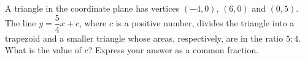 A triangle in the coordinate plane has vertices $(-4,0)$, $(6,0)$ and $(0,5)$. The line $y=\dfrac{5}{4}x+c$, where $c$ is a positive number, divides the triangle into a trapezoid and a smaller triangle whose areas, respectively, are in the ratio $5:4$. What is the value of $c$? Express your answer as a common fraction.
